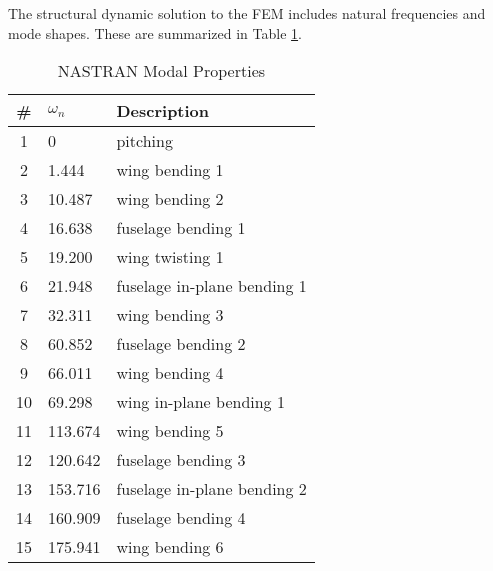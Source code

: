 The structural dynamic solution to the FEM includes natural frequencies and mode shapes. These are summarized in Table \ref{tab:nastranResult}.
\begin{table}[H]
	\centering
	\label{tab:nastranResult}
	\caption{NASTRAN Modal Properties}
	\begin{tabular}{cll}
		\hline\hline
		\# & $\omega_n$ & Description \\
		\hline
		1  &   0     & pitching \\
		2  &   1.444 & wing bending 1 \\
		3  &  10.487 & wing bending 2 \\
		4  &  16.638 & fuselage bending 1 \\
		5  &  19.200 & wing twisting 1 \\
		6  &  21.948 & fuselage in-plane bending 1 \\
		7  &  32.311 & wing bending 3 \\
		8  &  60.852 & fuselage bending 2 \\
		9  &  66.011 & wing bending 4 \\
		10 &  69.298 & wing in-plane bending 1 \\
		11 & 113.674 & wing bending 5 \\
		12 & 120.642 & fuselage bending 3 \\
		13 & 153.716 & fuselage in-plane bending 2  \\
		14 & 160.909 & fuselage bending 4 \\
		15 & 175.941 & wing bending 6 \\
		\hline\hline
	\end{tabular}
\end{table}